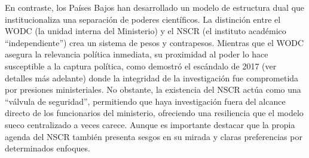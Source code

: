 \documentclass[
  spanish,
  letterpaper,
  DIV=11,
  numbers=noendperiod]{scrreprt}
\begin{document}
En contraste, los Países Bajos han desarrollado un modelo de estructura
dual que institucionaliza una separación de poderes científicos. La
distinción entre el WODC (la unidad interna del Ministerio) y el NSCR
(el instituto académico ``independiente'') crea un sistema de pesos y
contrapesos. Mientras que el WODC asegura la relevancia política
inmediata, su proximidad al poder lo hace susceptible a la captura
política, como demostró el escándalo de 2017 (ver detalles más adelante)
donde la integridad de la investigación fue comprometida por presiones
ministeriales. No obstante, la existencia del NSCR actúa como una
``válvula de seguridad'', permitiendo que haya investigación fuera del
alcance directo de los funcionarios del ministerio, ofreciendo una
resiliencia que el modelo sueco centralizado a veces carece. Aunque es
importante destacar que la propia agenda del NSCR también presenta
sesgos en su mirada y claras preferencias por determinados enfoques.
\end{document}
